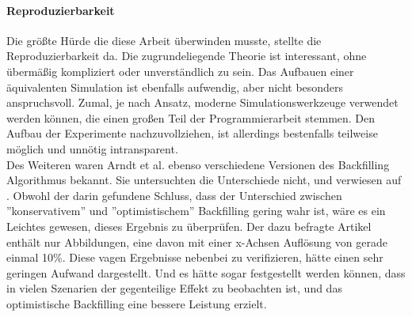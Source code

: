 \paragraph{Reproduzierbarkeit}
Die größte Hürde  die diese Arbeit überwinden musste, stellte die Reproduzierbarkeit da. Die zugrundeliegende Theorie ist interessant, ohne übermäßig kompliziert oder unverständlich zu sein. Das Aufbauen einer äquivalenten Simulation ist ebenfalls aufwendig, aber nicht besonders anspruchsvoll. Zumal, je nach Ansatz, moderne Simulationswerkzeuge verwendet werden können, die einen großen Teil der Programmierarbeit stemmen.
Den Aufbau der Experimente nachzuvollziehen, ist allerdings bestenfalls teilweise möglich und unnötig intransparent. \\
Des Weiteren waren Arndt et al. ebenso verschiedene Versionen des Backfilling Algorithmus bekannt. Sie untersuchten die Unterschiede nicht, und verwiesen auf \cite{optVsCons}. Obwohl der darin gefundene Schluss, dass der Unterschied zwischen ''konservativem'' und ''optimistischem'' Backfilling gering wahr ist, wäre es ein Leichtes gewesen, dieses Ergebnis zu überprüfen. Der dazu befragte Artikel enthält nur Abbildungen, eine davon mit einer x-Achsen Auflösung von gerade einmal 10\%. Diese vagen Ergebnisse nebenbei zu verifizieren, hätte einen sehr geringen Aufwand dargestellt. Und es hätte sogar festgestellt werden können, dass in vielen Szenarien der gegenteilige Effekt zu beobachten ist, und das optimistische Backfilling eine bessere Leistung erzielt.

